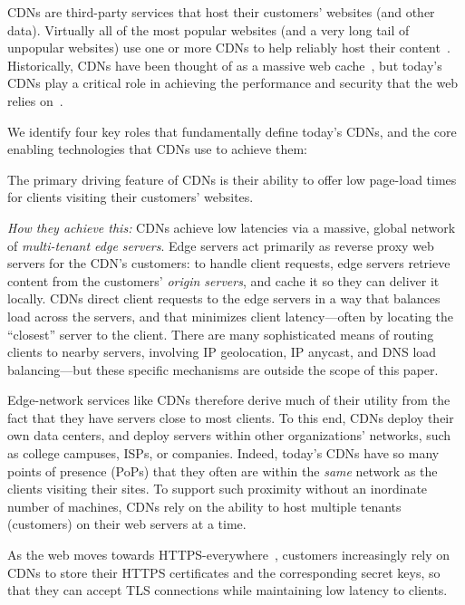 CDNs are third-party services that host their customers' websites (and
other data).
%
Virtually all of the most popular websites (and a very long tail of
unpopular websites) use one or more CDNs to help reliably host their
content~\cite{key-sharing}.
%
Historically, CDNs have been thought of as a massive web
cache~\cite{cdn-on-demand}, but today's CDNs play a critical role in
achieving the performance and security that the web relies
on~\cite{securing-cdns}.


We identify four key roles that fundamentally define today's CDNs, and
the core enabling technologies that CDNs use to achieve them:

%
The primary driving feature of CDNs is their ability to offer low
page-load times for clients visiting their customers' websites.
	
\medskip\noindent
%
\emph{How they achieve this:}
%
CDNs achieve low latencies via a massive, global network of
\emph{multi-tenant edge servers}.
%
Edge servers act primarily as reverse proxy web servers for the CDN's
customers: to handle client requests, edge servers retrieve content
from the customers' \emph{origin servers}, and cache it so they can
deliver it locally.
%
CDNs direct client requests to the edge servers in a way that balances
load across the servers, and that minimizes client latency---often by
locating the ``closest'' server to the client.
%
There are many sophisticated means of routing clients to nearby
servers, involving IP geolocation, IP anycast, and DNS load
balancing---but these specific mechanisms are outside the scope of this
paper.


Edge-network services like CDNs therefore derive much of their utility
from the fact that they have servers close to most clients.
%
To this end, CDNs deploy their own data centers, and deploy servers
within other organizations' networks, such as college campuses, ISPs,
or companies.
%
Indeed, today's CDNs have so many points of presence (PoPs) that they
often are within the \emph{same} network as the clients visiting their
sites.
%
To support such proximity without an inordinate number of machines,
CDNs rely on the ability to host multiple tenants (customers) on
their web servers at a time.


%
As the web moves towards
HTTPS-everywhere~\cite{felt-2017-https}, customers increasingly
rely on CDNs to store their HTTPS certificates and the corresponding
secret keys, so that they can accept TLS connections while maintaining
low latency to clients.


